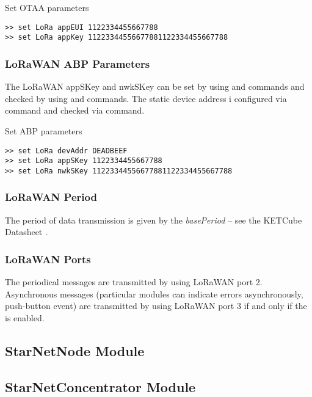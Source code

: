 \begin{docCodeExampleTitled}{Set OTAA parameters}
\begin{verbatim}
>> set LoRa appEUI 1122334455667788
>> set LoRa appKey 11223344556677881122334455667788
\end{verbatim}
\end{docCodeExampleTitled}
  
\subsubsection{LoRaWAN ABP Parameters}
The LoRaWAN appSKey and nwkSKey can be set by using  and  commands and checked by using  and  commands. The static device address i configured via   command and checked via   command.
  
\begin{docCodeExampleTitled}{Set ABP parameters}
\begin{verbatim}
>> set LoRa devAddr DEADBEEF
>> set LoRa appSKey 1122334455667788
>> set LoRa nwkSKey 11223344556677881122334455667788
\end{verbatim}
\end{docCodeExampleTitled}

\subsubsection{LoRaWAN Period}
The period of data transmission is given by the {\it basePeriod} -- see the KETCube Datasheet \cite{ZCU:KETCube:05-2018}.

\subsubsection{LoRaWAN Ports}

  The periodical messages are transmitted by using LoRaWAN port 2. Asynchronous messages (particular modules can indicate errors asynchronously, push-button event) are transmitted by using LoRaWAN port 3 if and only if the  is enabled.

\clearpage
\subsection{StarNetNode Module}

\clearpage
\subsection{StarNetConcentrator Module}

